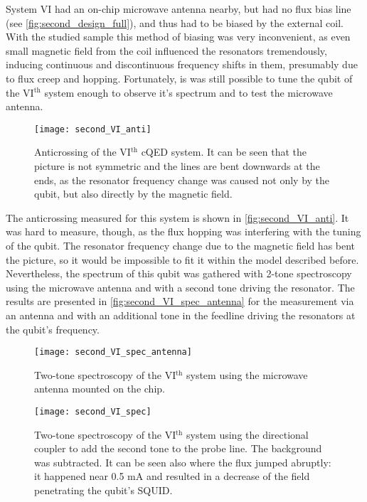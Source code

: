 System VI had an on-chip microwave antenna nearby, but had no flux bias line (see \autoref{fig:second_design_full}), and thus had to be biased by the external coil. With the studied sample this method of biasing was very inconvenient, as even small magnetic field from the coil influenced the resonators tremendously, inducing continuous and discontinuous frequency shifts in them, presumably due to flux creep and hopping. Fortunately, is was still possible to tune the qubit of the VI$^{\text{th}}$ system enough to observe it's spectrum and to test the microwave antenna.

\begin{figure}
\centering
\texttt{[image: second\_VI\_anti]}
\caption{Anticrossing of the VI$^{\text{th}}$ cQED system. It can be seen that the picture is not symmetric and   the lines are bent downwards at the ends, as the resonator frequency change was caused not only by the qubit, but also directly by the magnetic field.}
\label{fig:second_VI_anti}
\end{figure}

The anticrossing measured for this system is shown in \autoref{fig:second_VI_anti}. It was hard to measure, though, as the flux hopping was interfering with the tuning of the qubit. The resonator frequency change due to the magnetic field has bent the picture, so it would be impossible to fit it within the model described before. Nevertheless, the spectrum of this qubit was gathered with 2-tone spectroscopy using the microwave antenna and with a second tone driving the resonator. The results are presented in \autoref{fig:second_VI_spec_antenna} for the measurement via an antenna and with an additional tone in the feedline driving the resonators at the qubit's frequency.

\begin{figure}[h]
\texttt{[image: second\_VI\_spec\_antenna]}
\caption{Two-tone spectroscopy of the VI$^{\text{th}}$ system using the microwave antenna mounted on the chip.}
\label{fig:second_VI_spec_antenna}
\end{figure}

\begin{figure}[h]
\texttt{[image: second\_VI\_spec]}
\caption{Two-tone spectroscopy of the VI$^{\text{th}}$ system using the directional coupler to add the second tone to the probe line. The background was subtracted. It can be seen also where the flux jumped abruptly: it happened near 0.5 mA and resulted in a decrease of the field penetrating the qubit's SQUID.}
\label{fig:second_VI_spec_antenna}
\end{figure}
